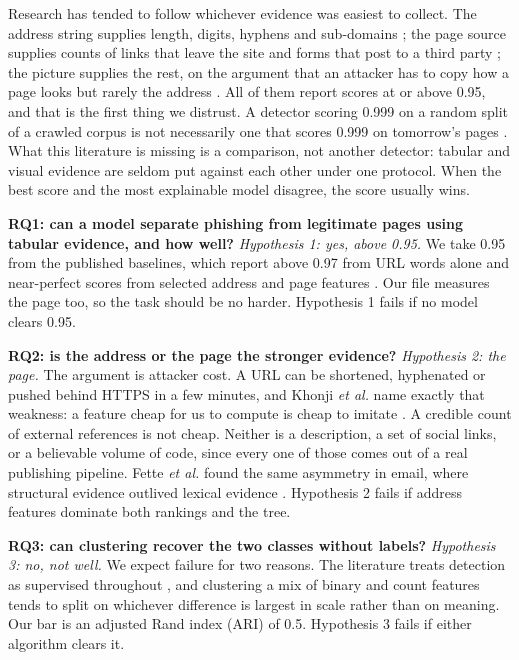 \documentclass[11pt,journal,a4paper]{IEEEtran}
\begin{document}
Research has tended to follow whichever evidence was easiest to collect. The address string supplies length, digits, hyphens and sub-domains
\cite{sahingoz2019ml,rao2019detection,marchal2014phishstorm}; the page source supplies counts of links that leave
the site and forms that post to a third party \cite{rao2019detection,fette2007learning}; the picture supplies the
rest, on the argument that an attacker has to copy how a page looks but rarely the address \cite{lin2021phishpedia}. All of them report scores at or above
0.95, and that is the first thing we distrust. A detector scoring 0.999 on a random split of a crawled corpus is
not necessarily one that scores 0.999 on tomorrow's pages \cite{marchal2014phishstorm}. What this literature is
missing is a comparison, not another detector: tabular and visual evidence are seldom put against each other
under one protocol. When the best score and the most explainable model disagree, the score usually wins.

\textbf{RQ1: can a model separate phishing from legitimate pages using tabular evidence, and how well?}
\emph{Hypothesis 1: yes, above 0.95.} We take 0.95 from the published baselines, which report above 0.97 from URL
words alone \cite{sahingoz2019ml} and near-perfect scores from selected address and page features
\cite{rao2019detection}. Our file measures the page too, so the task should be no harder. Hypothesis 1 fails if no
model clears 0.95.

\textbf{RQ2: is the address or the page the stronger evidence?} \emph{Hypothesis 2: the page.} The argument is
attacker cost. A URL can be shortened, hyphenated or pushed behind HTTPS in a few minutes, and Khonji \emph{et al.}
name exactly that weakness: a feature cheap for us to compute is cheap to imitate \cite{khonji2013phishing}. A
credible count of external references is not cheap. Neither is a description, a set of social links, or a believable volume of code,
since every one of those comes out of a real publishing pipeline. Fette \emph{et al.} found the
same asymmetry in email, where structural evidence outlived lexical evidence \cite{fette2007learning}. Hypothesis 2
fails if address features dominate both rankings and the tree.

\textbf{RQ3: can clustering recover the two classes without labels?} \emph{Hypothesis 3: no, not well.} We expect
failure for two reasons. The literature treats detection as supervised throughout \cite{basit2021comprehensive},
and clustering a mix of binary and count features tends to split on whichever difference is largest in scale
rather than on meaning. Our bar is an adjusted Rand index (ARI) of 0.5. Hypothesis 3 fails if either algorithm
clears it.
\end{document}
